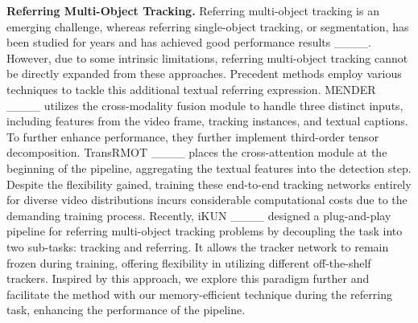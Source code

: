 {\bfseries Referring Multi-Object Tracking.}
Referring multi-object tracking is an emerging challenge, whereas referring single-object tracking, or segmentation, has been studied for years and has achieved good performance results ____. However, due to some intrinsic limitations, referring multi-object tracking cannot be directly expanded from these approaches. Precedent methods employ various techniques to tackle this additional textual referring expression. MENDER ____ utilizes the cross-modality fusion module to handle three distinct inputs, including features from the video frame, tracking instances, and textual captions. To further enhance performance, they further implement third-order tensor decomposition. TransRMOT ____ places the cross-attention module at the beginning of the pipeline, aggregating the textual features into the detection step. Despite the flexibility gained, training these end-to-end tracking networks entirely for diverse video distributions incurs considerable computational costs due to the demanding training process. Recently, iKUN ____ designed a plug-and-play pipeline for referring multi-object tracking problems by decoupling the task into two sub-tasks: tracking and referring. It allows the tracker network to remain frozen during training, offering flexibility in utilizing different off-the-shelf trackers. Inspired by this approach, we explore this paradigm further and facilitate the method with our memory-efficient technique during the referring task, enhancing the performance of the pipeline.